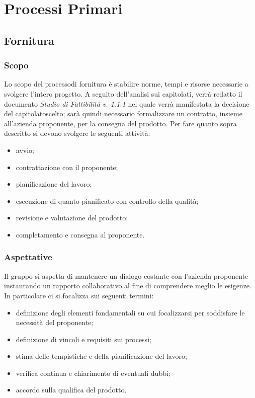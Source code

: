 \section{Processi Primari}
\subsection{Fornitura}
\subsubsection{Scopo}
Lo scopo del processo\glosp di fornitura è stabilire norme, tempi e risorse necessarie a svolgere l'intero progetto\glo.
A seguito dell'analisi sui capitolati\glo, verrà redatto il documento \textit{Studio di Fattibilità v. 1.1.1} nel quale verrà manifestata la decisione del capitolato\glosp scelto; sarà quindi necessario formalizzare un contratto, insieme all'azienda proponente, per la consegna del prodotto\glo. 
Per fare quanto sopra descritto si devono svolgere le seguenti attività:
\begin{itemize}
	\item avvio;
	\item contrattazione con il proponente;
	\item pianificazione del lavoro;
	\item esecuzione di quanto pianificato con controllo della qualità;
	\item revisione e valutazione del prodotto\glo;
	\item completamento e consegna al proponente.
\end{itemize}
\subsubsection{Aspettative}
Il gruppo si aspetta di mantenere un dialogo costante con l'azienda proponente instaurando un rapporto collaborativo al fine di comprendere meglio le esigenze. In particolare ci si focalizza sui seguenti termini:
\begin{itemize}
	\item definizione degli elementi fondamentali su cui focalizzarsi per soddisfare le necessità del proponente;
	\item definizione di vincoli e requisiti sui processi\glo;
	\item stima delle tempistiche e della pianificazione del lavoro;
	\item verifica continua e chiarimento di eventuali dubbi;
	\item accordo sulla qualifica del prodotto\glo.
\end{itemize} 
